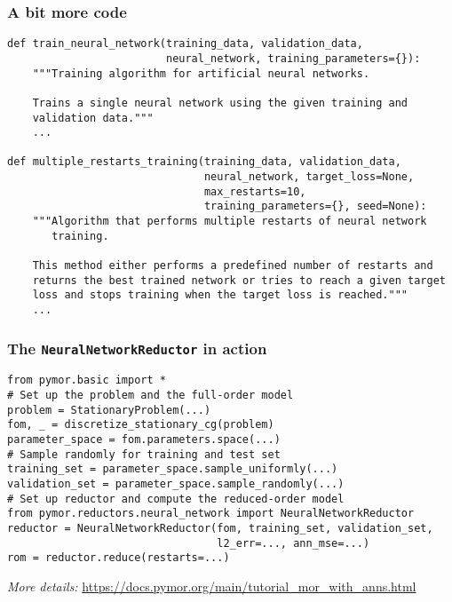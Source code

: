 \documentclass[%
]{beamer}
\begin{document}
\begin{frame}[fragile]
	\frametitle{A bit more code \textellipsis}
	\begin{verbatim}
def train_neural_network(training_data, validation_data,
                         neural_network, training_parameters={}):
    """Training algorithm for artificial neural networks.

    Trains a single neural network using the given training and
    validation data."""
    ...

def multiple_restarts_training(training_data, validation_data,
                               neural_network, target_loss=None,
                               max_restarts=10,
                               training_parameters={}, seed=None):
    """Algorithm that performs multiple restarts of neural network
       training.

    This method either performs a predefined number of restarts and
    returns the best trained network or tries to reach a given target
    loss and stops training when the target loss is reached."""
    ...
	\end{verbatim}
\end{frame}
\begin{frame}[fragile]
	\frametitle{The \texttt{NeuralNetworkReductor} in action}
	\begin{verbatim}
from pymor.basic import *
# Set up the problem and the full-order model
problem = StationaryProblem(...)
fom, _ = discretize_stationary_cg(problem)
parameter_space = fom.parameters.space(...)
# Sample randomly for training and test set
training_set = parameter_space.sample_uniformly(...)
validation_set = parameter_space.sample_randomly(...)
# Set up reductor and compute the reduced-order model
from pymor.reductors.neural_network import NeuralNetworkReductor
reductor = NeuralNetworkReductor(fom, training_set, validation_set,
                                 l2_err=..., ann_mse=...)
rom = reductor.reduce(restarts=...)
	\end{verbatim}
	\emph{More details:}
	\href{https://docs.pymor.org/main/tutorial_mor_with_anns.html}{\ttfamily\footnotesize https://docs.pymor.org/main/tutorial\_mor\_with\_anns.html}
\end{frame}
\end{document}

